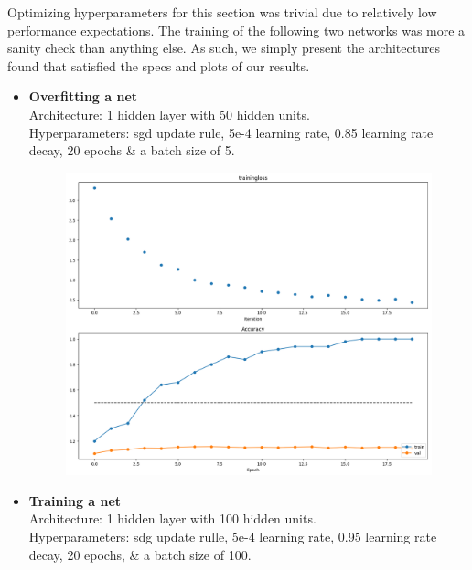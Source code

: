 Optimizing hyperparameters for this section was trivial due to relatively low performance expectations.
The training of the following two networks was more a sanity check than anything else.
As such, we simply present the architectures found that satisfied the specs and plots of our results.
\begin{itemize}[topsep=-13pt]
  
  \item \textbf{Overfitting a net}\\
    Architecture: 1 hidden layer with 50 hidden units.\\
    Hyperparameters: sgd update rule, 5e-4 learning rate, 0.85 learning rate decay, 20 epochs \&  a batch size of 5.
    

    \begin{figure}[!ht]
        \centering
        {{\includegraphics[scale = 0.32]{../nets/overfit_net/diagrams.png}}}  
    \end{figure}

  \item \textbf{Training a net}\\
    Architecture: 1 hidden layer with 100 hidden units.\\
    Hyperparameters: sdg update rulle, 5e-4 learning rate, 0.95 learning rate decay, 20 epochs, \& a batch size of 100.
    
    

\end{itemize}
